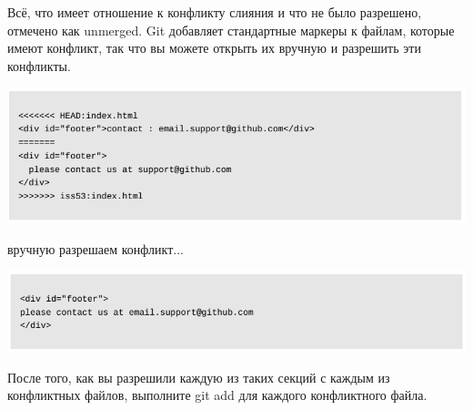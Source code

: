 \documentclass{beamer}
\begin{document}
\begin{frame}
Всё, что имеет отношение к конфликту слияния и что не было разрешено, отмечено как
unmerged. Git добавляет стандартные маркеры к файлам, которые имеют конфликт, так что вы
можете открыть их вручную и разрешить эти конфликты.
\begin{center}
\includegraphics[scale=0.4]{images/conf-03.png}
\end{center}
\begin{block}{вручную разрешаем конфликт...}
\begin{center}
\includegraphics[scale=0.4]{images/conf-04.png}
\end{center}
\end{block}
После того, как вы разрешили каждую из таких секций с каждым из конфликтных файлов, выполните git add для каждого конфликтного файла.
\end{frame}
\end{document}
